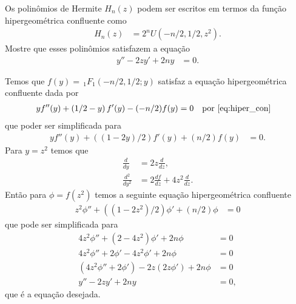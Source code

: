 \documentclass[a4paper,12pt, leqno, answers]{exam}
\begin{document}
\begin{questions}
     Os polinômios de Hermite $H_n(z)$ podem ser escritos em termos da fun\c{c}\~{a}o hipergeom\'{e}trica confluente como
    \begin{align*}
        H_n(z) &= 2^n U(-n/2, 1/2, z^2).
    \end{align*}
    Mostre que esses polin\^{o}mios satisfazem a equa\c{c}\~{a}o
    \begin{align*}
        y'' - 2 zy' + 2ny &= 0.
    \end{align*}
    \begin{solution}
        Temos que $f(y) = \,_1F_1(-n/2, 1/2; y)$ satisfaz a equa\c{c}\~{a}o hipergeom\'{e}trica confluente dada por
        \begin{align*}
            y f''(y) + \left( 1/2 - y \right) f'(y) - (-n/2) f(y) &= 0 && \text{por \eqref{eq:hiper_con}}
        \end{align*}
        que poder ser simplificada para
        \begin{align*}
            y f''(y) + \left( (1 - 2y) / 2 \right) f'(y) + (n/2) f(y) &= 0.
        \end{align*}
        Para $y = z^2$ temos que
        \begin{align*}
            \frac{d}{dy} &= 2 z \frac{d}{dz}, \\
            \frac{d^2}{dy^2} &= 2 \frac{df}{dz} + 4 z^2 \frac{d}{dz}.
        \end{align*}
        Ent\~{a}o para $\phi = f(z^2)$ temos a seguinte equa\c{c}\~{a}o hipergeom\'{e}trica confluente
        \begin{align*}
            z^2 \phi'' + \left( (1 - 2z^2)/2 \right) \phi' + (n/2) \phi &= 0
        \end{align*}
        que pode ser simplificada para
        \begin{align*}
            4 z^2 \phi'' + \left( 2 - 4z^2 \right) \phi' + 2n \phi &= 0 \\
            4 z^2 \phi'' + 2 \phi' - 4z^2 \phi' + 2n \phi &= 0 \\
            ( 4 z^2 \phi'' + 2 \phi') - 2 z (2 z \phi') + 2n \phi &= 0 \\
            y'' - 2 z y' + 2n y &= 0,
        \end{align*}
        que \'{e} a equa\c{c}\~{a}o desejada.
    \end{solution}


\end{questions}
\end{document}
